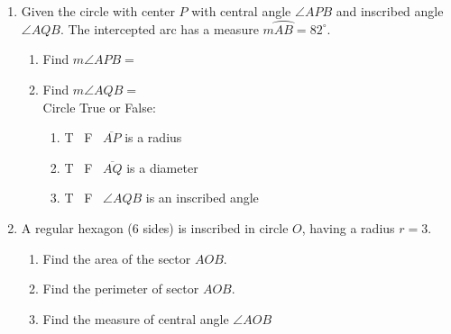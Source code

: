 \begin{enumerate}
\item Given the circle with center $P$ with central angle $\angle APB$ and inscribed angle $\angle AQB$. The intercepted arc has a measure $m \wideparen{AB}=82^\circ$.
\begin{multicols}{2}
  \raggedcolumns
  \begin{enumerate}
    \item Find $m\angle APB=$ \vspace{0.7cm}
    \item Find $m\angle AQB=$ \vspace{0.7cm}\\
    Circle True or False:
    \begin{enumerate}[itemsep=0.3cm]
      \item T \, F \, $\overline{AP}$ is a radius
      \item T \, F \, $\overline{AQ}$ is a diameter
      \item T \, F \, $\angle AQB$ is an inscribed angle
    \end{enumerate}
  \end{enumerate}
\end{multicols} \vspace{0.5cm}

\item A regular hexagon (6 sides) is inscribed in circle $O$, having a radius $r=3$.
  \begin{multicols}{2}
  \raggedcolumns
  \begin{enumerate}[itemsep=1.5cm]
    \item Find the area of the sector $AOB$.
    \item Find the perimeter of sector $AOB$. %
    \item Find the measure of central angle $\angle AOB$
  \end{enumerate}
  \begin{flushright}
  \end{flushright}
  \end{multicols}
  \vspace{1cm}

\end{enumerate}

